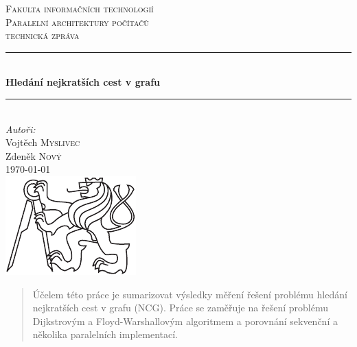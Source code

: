 \begin{titlepage}
\newcommand{\HRule}{\rule{\linewidth}{0.5mm}} %
\center

\textsc{\LARGE Fakulta informačních technologií}\\[1.5cm] %
\textsc{\Large Paralelní architektury počítačů}\\[0.5cm] %
\textsc{\large technická zpráva}\\[0.5cm] %


\HRule \\[0.4cm]
{ \huge \bfseries Hledání nejkratších cest v grafu}\\[0.4cm] %
\HRule \\[1.5cm]

\Large \emph{Autoři:}\\
Vojtěch \textsc{Myslivec}\\
Zdeněk \textsc{Nový}\\[2cm]	%

{\large \today}\\[3cm] %

\includegraphics{cvut-logo-bw.pdf}\\[1cm] %

\vfill %
\end{titlepage}

\renewcommand\abstractname{\begin{flushright}\begin{LARGE}\textbf{Abstrakt}\end
{LARGE}\end{flushright}}
\newcommand{\keywords}[1]{\vspace{0.8cm}\textbf{Klíčová slova\hspace{0.2cm}} #1}
\noindent\makebox[\linewidth]{\rule{\textwidth}{0.4pt}}
\begin{abstract}
Účelem této práce je sumarizovat výsledky měření řešení problému hledání nejkratších cest v grafu (NCG). Práce se zaměřuje na řešení problému Dijkstrovým a Floyd-Warshallovým algoritmem a porovnání sekvenční a několika paralelních implementací.
\end{abstract}

